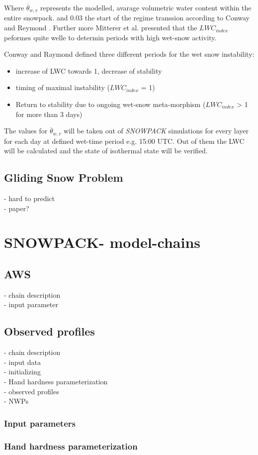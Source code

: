 \noindent Where $\overline{ \theta}_{w,v }$ represents the modelled, avarage volumetric water content within the 
entire snowpack. and $0.03$ the start of the regime transsion according to Conway and Reymond \autocite{conwaySnowStabilityRain1993}.
Further more Mitterer et al. presented that the $LWC_{index}$ peformes quite welle to determin periods with high 
wet-snow activity.\autocite{mittererOperationalSupportingTool2013} 

\noindent Conway and Raymond \autocite{conwaySnowStabilityRain1993} defined three different periods for the wet snow
instability:
\begin{itemize}
    \item increase of LWC towards 1, decrease of stability
    \item timing of maximal instability ($LWC_{index}$ = 1)
    \item Return to stability due to ongoing wet-snow meta-morphism ($LWC_{index}$ > 1 for more than 3 days)
\end{itemize}

\noindent The values for $\overline{ \theta}_{w,v }$ will be taken out of \textit{SNOWPACK} simulations for every layer
for each day at defined wet-time period e.g. 15:00 UTC. Out of them the LWC will be calculated and the state of 
isothermal state will be verified.

\subsection{Gliding Snow Problem}

- hard to predict \\
- paper? 

\section{SNOWPACK- model-chains}

\subsection {AWS}
- chain description \\
- input parameter\\


\subsection {Observed profiles}
- chain description\\
- input data\\
- initializing\\
- Hand hardness parameterization\\
- observed profiles\\
- NWPs

\subsubsection{Input parameters}

\subsubsection{Hand hardness parameterization}